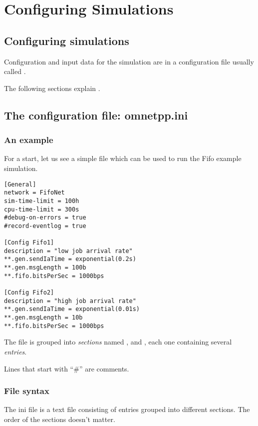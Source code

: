 \chapter{Configuring Simulations}
\label{cha:config-sim}

\section{Configuring simulations}

Configuration and input data for the simulation are in
a configuration file usually called .

The following sections explain .

\section{The configuration file: omnetpp.ini}

\subsection{An example}

For a start, let us see a simple  file which
can be used to run the Fifo example simulation.

\begin{verbatim}
[General]
network = FifoNet
sim-time-limit = 100h
cpu-time-limit = 300s
#debug-on-errors = true
#record-eventlog = true

[Config Fifo1]
description = "low job arrival rate"
**.gen.sendIaTime = exponential(0.2s)
**.gen.msgLength = 100b
**.fifo.bitsPerSec = 1000bps

[Config Fifo2]
description = "high job arrival rate"
**.gen.sendIaTime = exponential(0.01s)
**.gen.msgLength = 10b
**.fifo.bitsPerSec = 1000bps
\end{verbatim}

The file is grouped into \textit{sections} named \ttt{[General]}, 
and , each one containing several \textit{entries}.

Lines that start with ``\#'' are comments.


\subsection{File syntax}

The ini file is a text file consisting of entries grouped into different sections.
The order of the sections doesn't matter.

